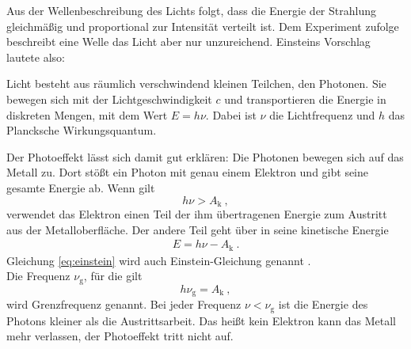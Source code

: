 Aus der Wellenbeschreibung des Lichts folgt, dass die Energie der Strahlung gleichmäßig und proportional zur Intensität verteilt ist. Dem Experiment zufolge beschreibt eine Welle das Licht aber nur unzureichend. Einsteins Vorschlag lautete also: \\
\par
\begingroup
{}
\rightskip\leftskip
{Licht besteht aus räumlich verschwindend kleinen Teilchen, den Photonen. Sie bewegen sich mit der Lichtgeschwindigkeit $c$ und transportieren die Energie in diskreten Mengen, mit dem Wert $E=h\nu$. Dabei ist $\nu$ die Lichtfrequenz und $h$ das Plancksche Wirkungsquantum.}
\par
\endgroup
Der Photoeffekt lässt sich damit gut erklären: Die Photonen bewegen sich auf das Metall zu. Dort stößt ein Photon mit genau einem Elektron und gibt seine gesamte Energie ab. Wenn gilt
\[ h\nu > A_\text{k} \ ,\]
verwendet das Elektron einen Teil der ihm übertragenen Energie zum Austritt aus der Metalloberfläche. Der andere Teil geht über in seine kinetische Energie
\begin{align}\label{eq:einstein}
	E = h\nu - A_\text{k} \ .
\end{align}
Gleichung \ref{eq:einstein} wird auch Einstein-Gleichung genannt \cite{Gerthsen}. \\
Die Frequenz $\nu_\text{g}$, für die gilt
\[ h\nu_\text{g} = A_\text{k} \ , \]
wird Grenzfrequenz genannt. Bei jeder Frequenz $\nu<\nu_\text{g}$ ist die Energie des Photons kleiner als die Austrittsarbeit. Das heißt kein Elektron kann das Metall mehr verlassen, der Photoeffekt tritt nicht auf.